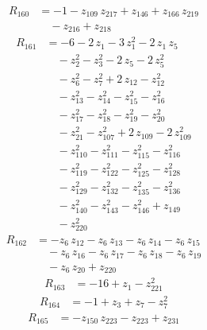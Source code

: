 \begin{equation*}\begin{aligned}
R_{160}&=-1 -z_{109}\,z_{217} +z_{146} +z_{166}\,z_{219} \\
&\quad -z_{216} +z_{218}
\end{aligned}\end{equation*}
\begin{equation*}\begin{aligned}
R_{161}&=-6 -2\,z_{1} -3\,z_{1}^{2} -2\,z_{1}\,z_{5} \\
&\quad -z_{2}^{2} -z_{3}^{2} -2\,z_{5} -2\,z_{5}^{2} \\
&\quad -z_{6}^{2} -z_{7}^{2} +2\,z_{12} -z_{12}^{2} \\
&\quad -z_{13}^{2} -z_{14}^{2} -z_{15}^{2} -z_{16}^{2} \\
&\quad -z_{17}^{2} -z_{18}^{2} -z_{19}^{2} -z_{20}^{2} \\
&\quad -z_{21}^{2} -z_{107}^{2} +2\,z_{109} -2\,z_{109}^{2} \\
&\quad -z_{110}^{2} -z_{111}^{2} -z_{115}^{2} -z_{116}^{2} \\
&\quad -z_{119}^{2} -z_{122}^{2} -z_{125}^{2} -z_{128}^{2} \\
&\quad -z_{129}^{2} -z_{132}^{2} -z_{135}^{2} -z_{136}^{2} \\
&\quad -z_{140}^{2} -z_{143}^{2} -z_{146}^{2} +z_{149} \\
&\quad -z_{220}^{2}
\end{aligned}\end{equation*}
\begin{equation*}\begin{aligned}
R_{162}&=-z_{6}\,z_{12} -z_{6}\,z_{13} -z_{6}\,z_{14} -z_{6}\,z_{15} \\
&\quad -z_{6}\,z_{16} -z_{6}\,z_{17} -z_{6}\,z_{18} -z_{6}\,z_{19} \\
&\quad -z_{6}\,z_{20} +z_{220}
\end{aligned}\end{equation*}
\begin{equation*}\begin{aligned}
R_{163}&=-16 +z_{1} -z_{221}^{2}
\end{aligned}\end{equation*}
\begin{equation*}\begin{aligned}
R_{164}&=-1 +z_{3} +z_{7} -z_{7}^{2}
\end{aligned}\end{equation*}
\begin{equation*}\begin{aligned}
R_{165}&=-z_{150}\,z_{223} -z_{223} +z_{231}
\end{aligned}\end{equation*}

